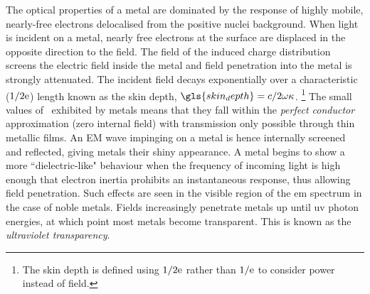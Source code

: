 \documentclass{article}
\begin{document}
The optical properties of a metal are dominated by the response of highly mobile, nearly-free electrons delocalised from the positive nuclei background. When light is incident on a metal, nearly free electrons at the surface are displaced in the opposite direction to the field. The field of the induced charge distribution screens the electric field inside the metal and field penetration into the metal is strongly attenuated. The incident field decays exponentially over a characteristic ($1/2\mathrm{e}$) length known as the skin depth, $\gls{skin_depth} = c/2\omega\kappa$.%
\footnote{The skin depth is defined using $1/2\mathrm{e}$ rather than $1/\mathrm{e}$ to consider power instead of field.}
The small values of \skindepth\ exhibited by metals means that they fall within the \textit{perfect conductor} approximation (zero internal field) with transmission only possible through thin metallic films. An EM wave impinging on a metal is hence internally screened and reflected, giving metals their shiny appearance. A metal begins to show a more ``dielectric-like" behaviour when the frequency of incoming light is high enough that electron inertia prohibits an instantaneous response, thus allowing field penetration. Such effects are seen in the visible region of the \gls{em} spectrum in the case of noble metals. Fields increasingly penetrate metals up until \gls{uv} photon energies, at which point most metals become transparent. This is known as the \textit{ultraviolet transparency}.
\end{document}
